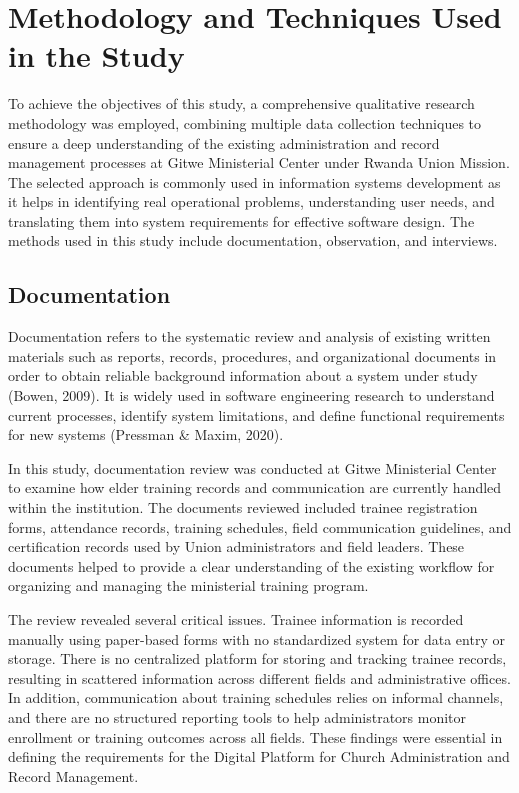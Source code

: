\documentclass[12pt]{report}
\begin{document}
\section{Methodology and Techniques Used in the Study}
To achieve the objectives of this study, a comprehensive qualitative research methodology was employed, combining multiple data collection techniques to ensure a deep understanding of the existing administration and record management processes at Gitwe Ministerial Center under Rwanda Union Mission. The selected approach is commonly used in information systems development as it helps in identifying real operational problems, understanding user needs, and translating them into system requirements for effective software design. The methods used in this study include documentation, observation, and interviews.

\subsection*{Documentation}
Documentation refers to the systematic review and analysis of existing written materials such as reports, records, procedures, and organizational documents in order to obtain reliable background information about a system under study (Bowen, 2009). It is widely used in software engineering research to understand current processes, identify system limitations, and define functional requirements for new systems (Pressman \& Maxim, 2020).

In this study, documentation review was conducted at Gitwe Ministerial Center to examine how elder training records and communication are currently handled within the institution. The documents reviewed included trainee registration forms, attendance records, training schedules, field communication guidelines, and certification records used by Union administrators and field leaders. These documents helped to provide a clear understanding of the existing workflow for organizing and managing the ministerial training program.

The review revealed several critical issues. Trainee information is recorded manually using paper-based forms with no standardized system for data entry or storage. There is no centralized platform for storing and tracking trainee records, resulting in scattered information across different fields and administrative offices. In addition, communication about training schedules relies on informal channels, and there are no structured reporting tools to help administrators monitor enrollment or training outcomes across all fields. These findings were essential in defining the requirements for the Digital Platform for Church Administration and Record Management.
\end{document}
